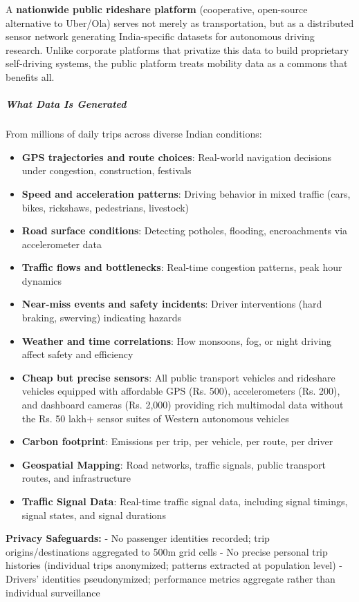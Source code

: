 A \textbf{nationwide public rideshare platform} (cooperative,
open-source alternative to Uber/Ola) serves not merely as
transportation, but as a distributed sensor network generating
India-specific datasets for autonomous driving research. Unlike
corporate platforms that privatize this data to build proprietary
self-driving systems, the public platform treats mobility data as a
commons that benefits all.

\subparagraph{What Data Is Generated}\label{what-data-is-generated}

From millions of daily trips across diverse Indian conditions:

\begin{itemize}
\tightlist
\item
  \textbf{GPS trajectories and route choices}: Real-world navigation
  decisions under congestion, construction, festivals
\item
  \textbf{Speed and acceleration patterns}: Driving behavior in mixed
  traffic (cars, bikes, rickshaws, pedestrians, livestock)
\item
  \textbf{Road surface conditions}: Detecting potholes, flooding,
  encroachments via accelerometer data
\item
  \textbf{Traffic flows and bottlenecks}: Real-time congestion patterns,
  peak hour dynamics
\item
  \textbf{Near-miss events and safety incidents}: Driver interventions
  (hard braking, swerving) indicating hazards
\item
  \textbf{Weather and time correlations}: How monsoons, fog, or night
  driving affect safety and efficiency
\item
  \textbf{Cheap but precise sensors}: All public transport vehicles and
  rideshare vehicles equipped with affordable GPS (Rs. 500),
  accelerometers (Rs. 200), and dashboard cameras (Rs. 2,000) providing
  rich multimodal data without the Rs. 50 lakh+ sensor suites of Western
  autonomous vehicles
\item
  \textbf{Carbon footprint}: Emissions per trip, per vehicle, per route,
  per driver
\item
  \textbf{Geospatial Mapping}: Road networks, traffic signals, public
  transport routes, and infrastructure
\item
  \textbf{Traffic Signal Data}: Real-time traffic signal data, including
  signal timings, signal states, and signal durations
\end{itemize}

\textbf{Privacy Safeguards:} - No passenger identities recorded; trip
origins/destinations aggregated to 500m grid cells - No precise personal
trip histories (individual trips anonymized; patterns extracted at
population level) - Drivers' identities pseudonymized; performance
metrics aggregate rather than individual surveillance

